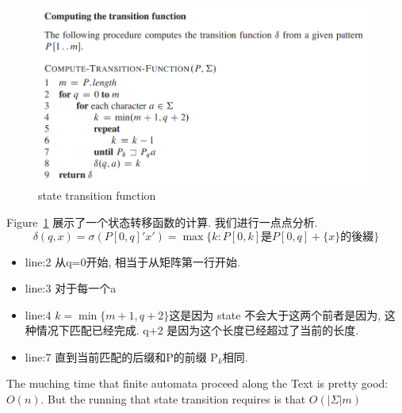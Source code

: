 \documentclass[a4paper, 10pt]{ctexart} %
\begin{document}
\begin{figure}[]
    \centering
    \includegraphics[scale = 0.5]{sm1.png}
    \caption{state transition function}
    \label{fig:sm1}
\end{figure} 
Figure~\ref{fig:sm1} 展示了一个状态转移函数的计算. 我们进行一点点分析.
$$ \delta (q, x)  =\sigma (P [0,q] ' x' )  = \max \{ k : P[0,k] \text{是} P[0,q] + \{x\} \text{的後綴}\} $$
\begin{itemize}
    \item 
line:2 从q=0开始, 相当于从矩阵第一行开始. 
    \item 
line:3 对于每一个a
    \item
line:4 $ k=\min\{m+1,q+2\} $这是因为 state 不会大于这两个前者是因为, 这种情况下匹配已经完成. q+2 是因为这个长度已经超过了当前的长度. 
    \item
line:7 直到当前匹配的后缀和P的前缀 P$_{k}$相同. 
\end{itemize}
The muching time that finite automata proceed along the Text is 
pretty good: $O \left(n\right)$. 
But the running that state transition requires is that 
$O\left( \left| \Sigma \right| m\right)$

\end{document}
